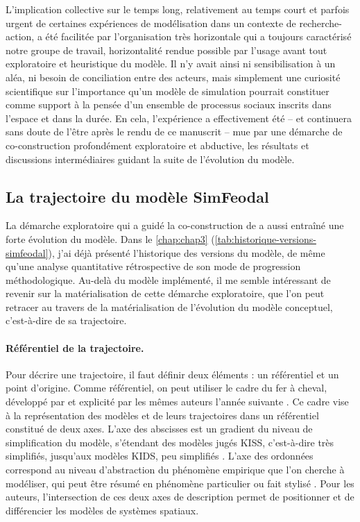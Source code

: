 L'implication collective sur le temps long, relativement au temps court et parfois urgent de certaines expériences de modélisation dans un contexte de recherche-action, a été facilitée par l'organisation très horizontale qui a toujours caractérisé notre groupe de travail, horizontalité rendue possible par l'usage avant tout exploratoire et heuristique du modèle.
Il n'y avait ainsi ni sensibilisation à un aléa, ni besoin de conciliation entre des acteurs, mais simplement une curiosité scientifique sur l'importance qu'un modèle de simulation pourrait constituer comme support à la pensée d'un ensemble de processus sociaux inscrits dans l'espace et dans la durée.
En cela, l'expérience \simfeodal{} a effectivement été -- et continuera sans doute de l'être après le rendu de ce manuscrit -- mue par une démarche de co-construction profondément exploratoire et abductive, les résultats et discussions intermédiaires guidant la suite de l'évolution du modèle.

\subsection{La trajectoire du modèle SimFeodal}

La démarche exploratoire qui a guidé la co-construction de \simfeodal{} a aussi entraîné une forte évolution du modèle.
Dans le \cref{chap:chap3} (\cref{tab:historique-versions-simfeodal}), j'ai déjà présenté l'historique des versions du modèle, de même qu'une analyse quantitative rétrospective de son mode de progression méthodologique.
Au-delà du modèle implémenté, il me semble intéressant de revenir sur la matérialisation de cette démarche exploratoire, que l'on peut retracer au travers de la matérialisation de l'évolution du modèle conceptuel, c'est-à-dire de sa trajectoire.

\paragraph{Référentiel de la trajectoire.}
Pour décrire une trajectoire, il faut définir deux éléments : un référentiel et un point d'origine.
Comme référentiel, on peut utiliser le cadre du \og fer à cheval\fg{}, développé par \textcite{banos2012vers} et explicité par les mêmes auteurs l'année suivante \autocite{banos2013modeliser}.
Ce cadre vise à la représentation des modèles et de leurs trajectoires dans un référentiel constitué de deux axes.
L'axe des abscisses est un gradient du \og niveau de simplification du modèle\fg{}, s'étendant des modèles jugés \og KISS\fg{}, c'est-à-dire très simplifiés, jusqu'aux modèles \og KIDS\fg{}, peu simplifiés \autocite[840-841]{banos2013modeliser}.
L'axe des ordonnées correspond au \og niveau d'abstraction du phénomène empirique que l'on cherche à modéliser\fg{}, qui peut être résumé en \og phénomène particulier ou fait stylisé\fg{} \autocite[839-840]{banos2013modeliser}.
Pour les auteurs, l'intersection de ces deux axes de description permet de positionner et de différencier les modèles de systèmes spatiaux.

